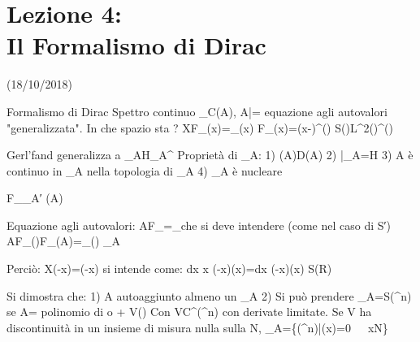 \documentclass[12pt]{article}
\begin{document}
\section{Lezione 4:\\ \large{Il Formalismo di Dirac}}
\vspace{-1em}
\begin{center}
    \small{(18/10/2018)}
\end{center}

Formalismo di Dirac
Spettro continuo \lambda\in \sigma_C\left(A\right), A\left|\lambda\right\rangle=\lambda\ket{\lambda} equazione agli autovalori "generalizzata".
In che spazio sta \ket{\lambda}?
XF_\lambda\left(x\right)=\lambdaF_\lambda\left(x\right)
F_\lambda\left(x\right)=\delta \left(x-\lambda\right)\in {}^\prime\left(\right)
S\left(\right)\subset L^2\left(\right)\subset {}^\prime\left(\right)

Gerl'fand generalizza a \phi_A\subset H\subset \phi_A^\prime
Proprietà di \phi_A:
	1) \phi \left(A\right)\subseteq D\left(A\right)
	2) {\bar{\phi}}_A=H
	3) A è continuo in \phi_A nella topologia di \phi_A 
	4) \phi_A è nucleare

F_\lambda\in \phi_A′
\lambda\in \sigma \left(A\right)

Equazione agli autovalori: AF_\lambda=\lambdaF_\lambda che si deve intendere (come nel caso di S′)
AF_\lambda\left(\varphi\right)\equiv F_\lambda\left(A\varphi\right)=\lambdaF_\lambda\left(\varphi\right) \forall \phi \in \phi_A
 
Perciò: X\delta \left(\lambda-x\right)=\lambda\delta \left(\lambda-x\right) si intende come:
\int dx x \delta \left(\lambda-x\right)\phi \left(x\right)=\int dx \lambda\delta \left(\lambda-x\right)\phi \left(x\right) \forall \phi \in S(R)

Si dimostra che:
	1) \forall A autoaggiunto \exists  almeno un \phi_A
	2) Si può prendere \phi_A=S(^n) se A= polinomio di  o  + V()
	Con V\in C^\infty\left(^n\right) con derivate limitate. Se V ha discontinuità in un insieme di misura nulla sulla N, \phi_A=\left\{\varphi\in{}\left(^n\right)|\varphi\left(x\right)=0\ \ \ x\in N\right\}
\end{document}
